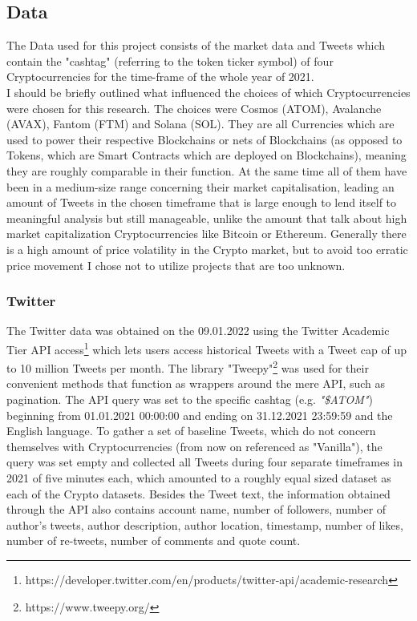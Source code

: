 \documentclass[11pt]{article}
\begin{document}
\subsection{Data}
The Data used for this project consists of the market data and Tweets which contain the "cashtag" (referring to the token ticker symbol) of four Cryptocurrencies for the time-frame of the whole year of 2021. \\
I should be briefly outlined what influenced the choices of which Cryptocurrencies were chosen for this research. The choices were Cosmos (ATOM), Avalanche (AVAX), Fantom (FTM) and Solana (SOL). They are all Currencies which are used to power their respective Blockchains or nets of Blockchains (as opposed to Tokens, which are Smart Contracts which are deployed on Blockchains), meaning they are roughly comparable in their function. At the same time all of them have been in a medium-size range concerning their market capitalisation, leading an amount of Tweets in the chosen timeframe that is large enough to lend itself to meaningful analysis but still manageable, unlike the amount that talk about high market capitalization Cryptocurrencies like Bitcoin or Ethereum. Generally there is a high amount of price volatility in the Crypto market, but to avoid too erratic price movement I chose not to utilize projects that are too unknown.
\subsubsection{Twitter}
The Twitter data was obtained on the 09.01.2022 using the Twitter Academic Tier API access\footnote{https://developer.twitter.com/en/products/twitter-api/academic-research} which lets users access historical Tweets with a Tweet cap of up to 10 million Tweets per month. The library "Tweepy"\footnote{https://www.tweepy.org/} was used for their convenient methods that function as wrappers around the mere API, such as pagination. The API query was set to the specific cashtag (e.g. \textit{"\$ATOM"}) beginning from 01.01.2021 00:00:00 and ending on 31.12.2021 23:59:59 and the English language. To gather a set of baseline Tweets, which do not concern themselves with Cryptocurrencies (from now on referenced as "Vanilla"), the query was set empty and collected all Tweets during four separate timeframes in 2021 of five minutes each, which amounted to a roughly equal sized dataset as each of the Crypto datasets. Besides the Tweet text, the information obtained through the API also contains account name, number of followers, number of author's tweets, author description, author location, timestamp, number of likes, number of re-tweets, number of comments and quote count. \\
\end{document}
